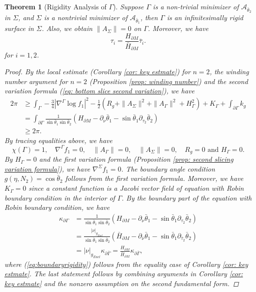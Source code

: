 \documentclass[11pt,letterpaper]{amsart}
\newtheorem{thm}[problem]{Theorem}
\begin{document}
\begin{thm}[Rigidity Analysis of $\Gamma$]\label{thm: rigidity of Gamma}
   Suppose $\Gamma$ is a non-trivial minimizer of $\mathcal A_{\bar{\theta}_2}$ in $\Sigma$, and $\Sigma$ is a nontrivial minimizer of $\mathcal A_{\bar{\theta}_1}$, then $\Gamma$ is an infinitesimally rigid surface in $\Sigma$. Also, we obtain $\|A_{\Sigma}\|=0$ on $\Gamma$. Moreover, we have 
    \[
   \tau_i=\frac{H_{\partial M}}{\bar{H}_{\partial M}}\bar{\tau}_i.
   \]
   for $i=1,2$.
\begin{proof}
    By the local estimate (Corollary \ref{cor: key estmate}) for $n=2$, the winding number argument for $n=2$ (Proposition \ref{prop: winding number}) and the second variation formula (\ref{eq: bottom slice second variation}), we have
    \begin{align*}
    2\pi&\geq \int_{\Gamma}-\frac{3}{4}|\nabla^{\Gamma}\log f_1|^2-\frac{1}{2}\left(R_g+\|A_{\Sigma}\|^2+\|A_{\Gamma}\|^2+H_{\Gamma}^2\right)+K_{\Gamma}+\int_{\partial\Gamma}k_g\\
    &=\int_{\partial\Gamma}\frac{1}{\sin\bar{\theta}_1\sin\bar{\theta}_2}\left(H_{\partial M}-\partial_{\nu}\bar{\theta}_1-\sin\bar{\theta}_1\partial_{\tau_2}\bar{\theta}_2\right)\\
    &\geq 2\pi.
    \end{align*}
    By tracing equalities above, we have
    \[
    \chi(\Gamma)=1,\quad \nabla^{\Gamma}f_1=0, \quad \|A_{\Gamma}\|=0,\quad \|A_{\Sigma}\|=0,\quad R_g=0 \text{ and }H_{\Gamma}=0.
    \]
    By $H_{\Gamma}=0$ and the first variation formula (Proposition \ref{prop: second slicing variation formula}), we have $\nabla^{\Sigma} f_{1}=0$. The boundary angle condition $g(\eta,N_2)=\cos\bar{\theta}_2$ follows from the first variation formula. Moreover, we have $K_{\Gamma}=0$ since a constant function is a Jacobi vector field of equation with Robin boundary condition in the interior of $\Gamma$. By the boundary part of the equation with Robin boundary condition, we have
    \begin{align}
        \nonumber \kappa_{\partial \Gamma} &= \frac{1}{\sin\bar{\theta}_1\sin\bar{\theta}_2}\left(H_{\partial{M}}-\partial_{\nu}\bar{\theta}_1-\sin\bar{\theta}_1\partial_{\tau_2}\bar{\theta}_2\right) \\ \label{eq:boundaryrigidity}
        &= \frac{|\nu|_{g_{Eucl}}}{\sin\bar{\theta}_1\sin\bar{\theta}_2}\left(\bar{H}_{\partial{M}}-\partial_{\bar{\nu}}\bar{\theta}_1-\sin\bar{\theta}_1\partial_{\bar{\tau}_2}\bar{\theta}_2\right) \\ \nonumber &= |\nu|_{g_{Eucl}} \kappa_{\partial \bar{\Gamma}} =  \frac{H_{\partial M}}{\bar{H}_{\partial M}}\kappa_{\partial\bar{\Gamma}},
    \end{align}where (\ref{eq:boundaryrigidity}) follows from the equality case of Corollary \ref{cor: key estmate}. The last statement follows by combining arguments in Corollary \ref{cor: key estmate} and the nonzero assumption on the second fundamental form.
    \end{proof}
    \end{thm}
\end{document}
